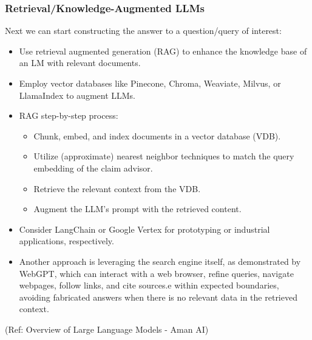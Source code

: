 \begin{frame}[fragile]\frametitle{Retrieval/Knowledge-Augmented LLMs}

Next we can start constructing the answer to a question/query of interest:

\begin{itemize}
\item Use retrieval augmented generation (RAG) to enhance the knowledge base of an LM with relevant documents.
\item Employ vector databases like Pinecone, Chroma, Weaviate, Milvus, or LlamaIndex to augment LLMs.
\item RAG step-by-step process:
	\begin{itemize}
	\item Chunk, embed, and index documents in a vector database (VDB).
	\item Utilize (approximate) nearest neighbor techniques to match the query embedding of the claim advisor.
	\item Retrieve the relevant context from the VDB.
	\item Augment the LLM's prompt with the retrieved content.
	\end{itemize}

\item Consider LangChain or Google Vertex for prototyping or industrial applications, respectively.
\item Another approach is leveraging the search engine itself, as demonstrated by WebGPT, which can interact with a web browser, refine queries, navigate webpages, follow links, and cite sources.e within expected boundaries, avoiding fabricated answers when there is no relevant data in the retrieved context.
\end{itemize}

{\tiny (Ref: Overview of Large Language Models - Aman AI)}

\end{frame}

